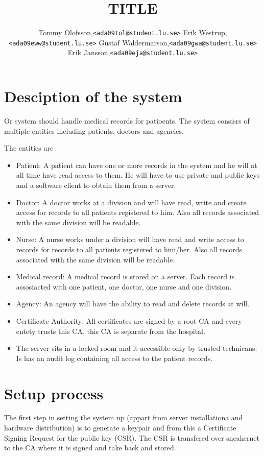 \documentclass[10pt, a4paper]{article}
\title{TITLE}
\date{}
\author{
Tommy Olofsson,\texttt{<ada09tol@student.lu.se>}
Erik Westrup,\texttt{<ada09eww@student.lu.se>}
Gustaf Waldermarson,\texttt{<ada09gwa@student.lu.se>}
Erik Jansson,\texttt{<ada09eja@student.lu.se>}
}
\begin{document}
\begin{titlepage}
\maketitle
\begin{center}
\end{center}

\thispagestyle{empty}
\end{titlepage}
\setcounter{page}{2}
\section{Desciption of the system}
Or system should handle medical records for patioents. The system consisrs of multiple entities including patients, doctors and agencies. 

The entities are
\begin{itemize}
\item Patient: A patient can have one or more records in the system and he will at all time have read access to them. He will have to use private and public keys and a software client to obtain them from a server. 
\item Doctor: A doctor works at a division and will have read, write and create access for records to all patients registered to him. Also all records associated with the same division will be readable.
\item Nurse: A nurse works under a division will have read and write access to records for records to all patients registered to him/her. Also all records associated with the same division will be readable.
\item Medical record: A medical record is stored on a server. Each record is assosiacted with one patient, one doctor, one nurse and one division.
\item Agency: An agency will have the ability to read and delete records at will.
\item Certificate Authority: All certificates are signed by a root CA and every entety trusts this CA, this CA is
separate from the hospital.
\item The server sits in a locked room and it accessible only by trusted technicans. Is has an audit log containing all access to the patient records.
\end{itemize}

\section{Setup process}
The first step in setting the system up (appart from server installationa and hardware distribution) is to generate a keypair and from this a Certificate Signing Request for the public key (CSR). The CSR is transfered over sneakernet to the CA where it is signed and take back and stored. 
\end{document}
